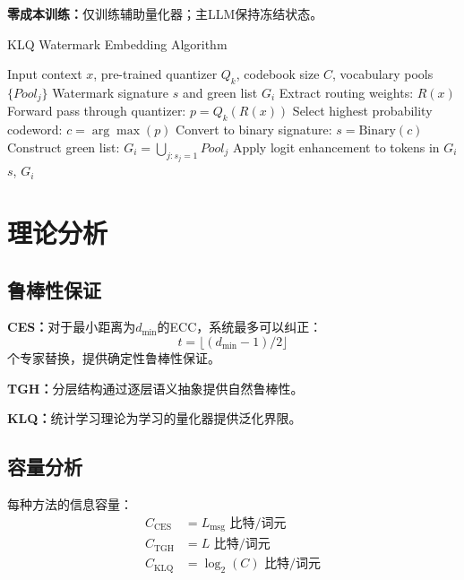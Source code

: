 \documentclass[letterpaper,twocolumn,10pt]{article}
\begin{document}
\textbf{零成本训练：}仅训练辅助量化器；主LLM保持冻结状态。

\begin{algorithm}[h]
\caption{KLQ Watermark Embedding Algorithm}
\begin{algorithmic}[1]
\REQUIRE Input context $x$, pre-trained quantizer $Q_k$, codebook size $C$, vocabulary pools $\{Pool_j\}$
\ENSURE Watermark signature $s$ and green list $G_i$
\STATE Extract routing weights: $R(x)$ 
\STATE Forward pass through quantizer: $p = Q_k(R(x))$ 
\STATE Select highest probability codeword: $c = \arg\max(p)$ 
\STATE Convert to binary signature: $s = \text{Binary}(c)$ 
\STATE Construct green list: $G_i = \bigcup_{j: s_j=1} Pool_j$ 
\STATE Apply logit enhancement to tokens in $G_i$ 
\RETURN $s$, $G_i$
\end{algorithmic}
\end{algorithm}

\section{理论分析}

\subsection{鲁棒性保证}

\textbf{CES：}对于最小距离为$d_{\min}$的ECC，系统最多可以纠正：
\begin{equation}
t = \lfloor(d_{\min}-1)/2\rfloor
\end{equation}
个专家替换，提供确定性鲁棒性保证。

\textbf{TGH：}分层结构通过逐层语义抽象提供自然鲁棒性。

\textbf{KLQ：}统计学习理论为学习的量化器提供泛化界限。

\subsection{容量分析}

每种方法的信息容量：
\begin{align}
C_{\text{CES}} &= L_{\text{msg}} \text{ 比特/词元} \\
C_{\text{TGH}} &= L \text{ 比特/词元} \\
C_{\text{KLQ}} &= \log_2(C) \text{ 比特/词元}
\end{align}
\end{document}
